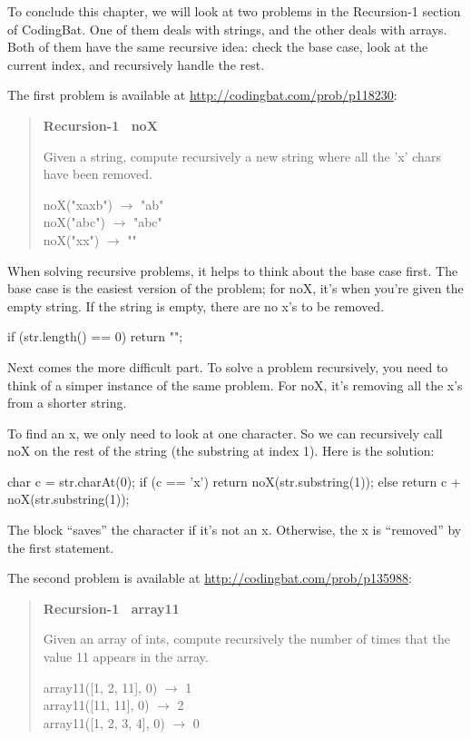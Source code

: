 To conclude this chapter, we will look at two problems in the {\sf Recursion-1} section of CodingBat.
One of them deals with strings, and the other deals with arrays.
Both of them have the same recursive idea: check the base case, look at the current index, and recursively handle the rest.

The first problem is available at \url{http://codingbat.com/prob/p118230}:

\begin{quote}
\textbf{Recursion-1 ~noX}

Given a string, compute recursively a new string where all the 'x' chars have been removed.

\ttfamily
noX("xaxb") $\rightarrow$ "ab" \\
noX("abc") $\rightarrow$ "abc" \\
noX("xx") $\rightarrow$ ""
\end{quote}

When solving recursive problems, it helps to think about the base case first.
The base case is the easiest version of the problem; for noX, it's when you're given the empty string.
If the string is empty, there are no x's to be removed.

\begin{code}
if (str.length() == 0) {
    return "";
}
\end{code}

Next comes the more difficult part.
To solve a problem recursively, you need to think of a simper instance of the same problem.
For noX, it's removing all the x's from a shorter string.

To find an x, we only need to look at one character.
So we can recursively call noX on the rest of the string (the substring at index 1).
Here is the solution:

\begin{code}
char c = str.charAt(0);
if (c == 'x') {
    return noX(str.substring(1));
} else {
    return c + noX(str.substring(1));
}
\end{code}

The  block ``saves'' the character if it's not an x.
Otherwise, the x is ``removed'' by the first  statement.

The second problem is available at \url{http://codingbat.com/prob/p135988}:

\begin{quote}
\textbf{Recursion-1 ~array11}

Given an array of ints, compute recursively the number of times that the value 11 appears in the array.

\ttfamily
array11([1, 2, 11], 0) $\rightarrow$ 1 \\
array11([11, 11], 0) $\rightarrow$ 2 \\
array11([1, 2, 3, 4], 0) $\rightarrow$ 0
\end{quote}

